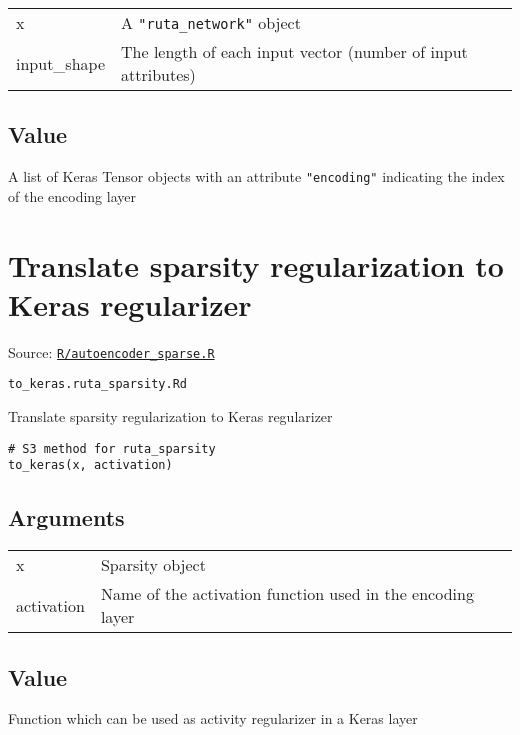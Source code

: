 \begin{longtable}[c]{@{}ll@{}}
\toprule
x & A \texttt{"ruta\_network"} object\tabularnewline
input\_shape & The length of each input vector (number of input
attributes)\tabularnewline
\bottomrule
\end{longtable}

\hypertarget{value}{\subsection{\texorpdfstring{\protect\hyperlink{value}{}Value}{Value}}\label{value}}

A list of Keras Tensor objects with an attribute \texttt{"encoding"}
indicating the index of the encoding layer

\section{Translate sparsity regularization to Keras
regularizer}\label{translate-sparsity-regularization-to-keras-regularizer}

Source:
\href{https://github.com/fdavidcl/ruta/blob/master/R/autoencoder_sparse.R}{\texttt{R/autoencoder\_sparse.R}}

\texttt{to\_keras.ruta\_sparsity.Rd}

Translate sparsity regularization to Keras regularizer

\begin{verbatim}
# S3 method for ruta_sparsity
to_keras(x, activation)
\end{verbatim}

\hypertarget{arguments}{\subsection{\texorpdfstring{\protect\hyperlink{arguments}{}Arguments}{Arguments}}\label{arguments}}

\begin{longtable}[c]{@{}ll@{}}
\toprule
x & Sparsity object\tabularnewline
activation & Name of the activation function used in the encoding
layer\tabularnewline
\bottomrule
\end{longtable}

\hypertarget{value}{\subsection{\texorpdfstring{\protect\hyperlink{value}{}Value}{Value}}\label{value}}

Function which can be used as activity regularizer in a Keras layer

